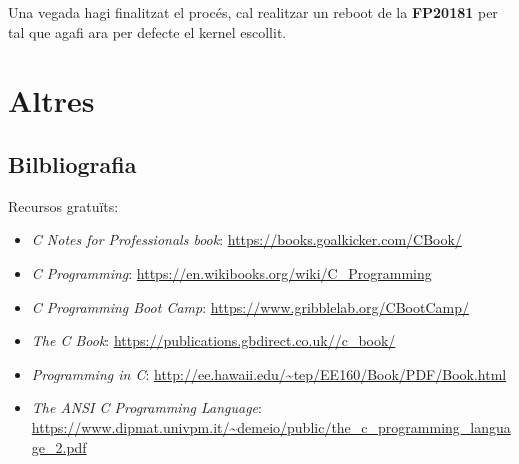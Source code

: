 \documentclass[]{book}
\providecommand{\tightlist}{%
  \setlength{\itemsep}{0pt}\setlength{\parskip}{0pt}}
\begin{document}
Una vegada hagi finalitzat el procés, cal realitzar un reboot de la \textbf{FP20181} per tal que agafi ara per defecte el kernel escollit.

\hypertarget{altres}{%
\chapter{Altres}\label{altres}}

\hypertarget{bilbliografia}{%
\section{Bilbliografia}\label{bilbliografia}}

Recursos gratuïts:

\begin{itemize}
\tightlist
\item
  \emph{C Notes for Professionals book}: \url{https://books.goalkicker.com/CBook/}
\item
  \emph{C Programming}: \url{https://en.wikibooks.org/wiki/C_Programming}
\item
  \emph{C Programming Boot Camp}: \url{https://www.gribblelab.org/CBootCamp/}
\item
  \emph{The C Book}: \url{https://publications.gbdirect.co.uk//c_book/}
\item
  \emph{Programming in C}: \url{http://ee.hawaii.edu/~tep/EE160/Book/PDF/Book.html}
\item
  \emph{The ANSI C Programming Language}: \url{https://www.dipmat.univpm.it/~demeio/public/the_c_programming_language_2.pdf}
\end{itemize}


\end{document}
